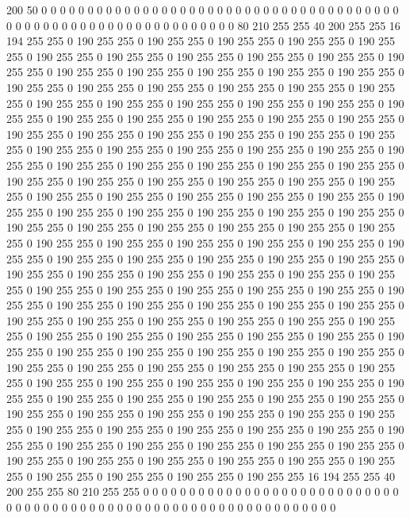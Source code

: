200 50 0 0 0 0 0 0 0 0 0 0 0 0 0 0 0 0 0 0 0 0 0 0 0 0 0 0 0 0 0 0 0 0 0 0 0 0 0 0 0 0 0 0 0 0 0 0 0 0 0 0 0 0 0 0 0 0 0 0 0 0 0 0 0 0 80 210 255 255 40 200 255 255 16 194 255 255 0 190 255 255 0 190 255 255 0 190 255 255 0 190 255 255 0 190 255 255 0 190 255 255 0 190 255 255 0 190 255 255 0 190 255 255 0 190 255 255 0 190 255 255 0 190 255 255 0 190 255 255 0 190 255 255 0 190 255 255 0 190 255 255 0 190 255 255 0 190 255 255 0 190 255 255 0 190 255 255 0 190 255 255 0 190 255 255 0 190 255 255 0 190 255 255 0 190 255 255 0 190 255 255 0 190 255 255 0 190 255 255 0 190 255 255 0 190 255 255 0 190 255 255 
0 190 255 255 0 190 255 255 0 190 255 255 0 190 255 255 0 190 255 255 0 190 255 255 0 190 255 255 0 190 255 255 0 190 255 255 0 190 255 255 0 190 255 255 0 190 255 255 0 190 255 255 0 190 255 255 0 190 255 255 0 190 255 255 0 190 255 255 0 190 255 255 0 190 255 255 0 190 255 255 0 190 255 255 0 190 255 255 0 190 255 255 0 190 255 255 0 190 255 255 0 190 255 255 0 190 255 255 0 190 255 255 0 190 255 255 0 190 255 255 0 190 255 255 0 190 255 255 0 190 255 255 0 190 255 255 0 190 255 255 0 190 255 255 0 190 255 255 0 190 255 255 0 190 255 255 0 190 255 255 0 190 255 255 0 190 255 255 0 190 255 255 0 190 255 255 0 190 255 255 0 190 255 255 0 190 255 255 0 190 255 255 0 190 255 255 0 190 255 255 
0 190 255 255 0 190 255 255 0 190 255 255 0 190 255 255 0 190 255 255 0 190 255 255 0 190 255 255 0 190 255 255 0 190 255 255 0 190 255 255 0 190 255 255 0 190 255 255 0 190 255 255 0 190 255 255 0 190 255 255 0 190 255 255 0 190 255 255 0 190 255 255 0 190 255 255 0 190 255 255 0 190 255 255 0 190 255 255 0 190 255 255 0 190 255 255 0 190 255 255 0 190 255 255 0 190 255 255 0 190 255 255 0 190 255 255 0 190 255 255 0 190 255 255 0 190 255 255 0 190 255 255 0 190 255 255 0 190 255 255 0 190 255 255 0 190 255 255 0 190 255 255 0 190 255 255 0 190 255 255 0 190 255 255 0 190 255 255 0 190 255 255 0 190 255 255 0 190 255 255 0 190 255 255 0 190 255 255 0 190 255 255 0 190 255 255 0 190 255 255 
0 190 255 255 0 190 255 255 0 190 255 255 0 190 255 255 0 190 255 255 0 190 255 255 0 190 255 255 0 190 255 255 0 190 255 255 0 190 255 255 0 190 255 255 0 190 255 255 0 190 255 255 0 190 255 255 0 190 255 255 0 190 255 255 0 190 255 255 0 190 255 255 0 190 255 255 0 190 255 255 0 190 255 255 0 190 255 255 0 190 255 255 0 190 255 255 0 190 255 255 0 190 255 255 0 190 255 255 0 190 255 255 0 190 255 255 0 190 255 255 0 190 255 255 16 194 255 255 40 200 255 255 80 210 255 255 0 0 0 0 0 0 0 0 0 0 0 0 0 0 0 0 0 0 0 0 0 0 0 0 0 0 0 0 0 0 0 0 0 0 0 0 0 0 0 0 0 0 0 0 0 0 0 0 0 0 0 0 0 0 0 0 0 0 0 0 0 0 0 0 
